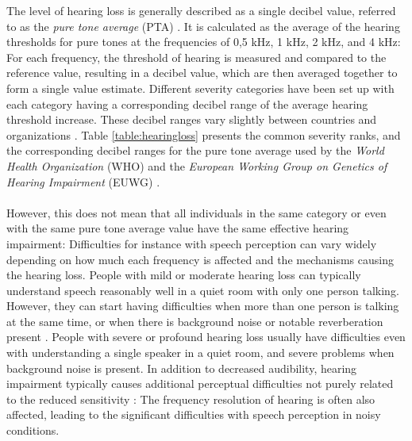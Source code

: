 \documentclass[english, 12pt, a4paper, pdftex, elec, utf8]{aaltothesis}
\begin{document}
The level of hearing loss is generally described as a single decibel value, referred to as the \textit{pure tone average} (PTA) \cite{moore2007cochlear, salonen2013hearing}. It is calculated as the average of the hearing thresholds for pure tones at the frequencies of 0,5 kHz, 1 kHz, 2 kHz, and 4 kHz: For each frequency, the threshold of hearing is measured and compared to the reference value, resulting in a decibel value, which are then averaged together to form a single value estimate. Different severity categories have been set up with each category having a corresponding decibel range of the average hearing threshold increase. These decibel ranges vary slightly between countries and organizations \cite{salonen2013hearing}. Table \ref{table:hearingloss} presents the common severity ranks, and the corresponding decibel ranges for the pure tone average used by the \textit{World Health Organization} (WHO) and the \textit{European Working Group on Genetics of Hearing Impairment} (EUWG) \cite{salonen2013hearing}. \\\\
However, this does not mean that all individuals in the same category or even with the same pure tone average value have the same effective hearing impairment: Difficulties for instance with speech perception can vary widely depending on how much each frequency is affected and the mechanisms causing the hearing loss. People with mild or moderate hearing loss can typically understand speech reasonably well in a quiet room with only one person talking. However, they can start having difficulties when more than one person is talking at the same time, or when there is background noise or notable reverberation present \cite{peterson2010cochlear}. People with severe or profound hearing loss usually have difficulties even with understanding a single speaker in a quiet room, and severe problems when background noise is present. In addition to decreased audibility, hearing impairment typically causes additional perceptual difficulties not purely related to the reduced sensitivity \cite{moore2007cochlear}: The frequency resolution of hearing is often also affected, leading to the significant difficulties with speech perception in noisy conditions. \\\\
\end{document}
